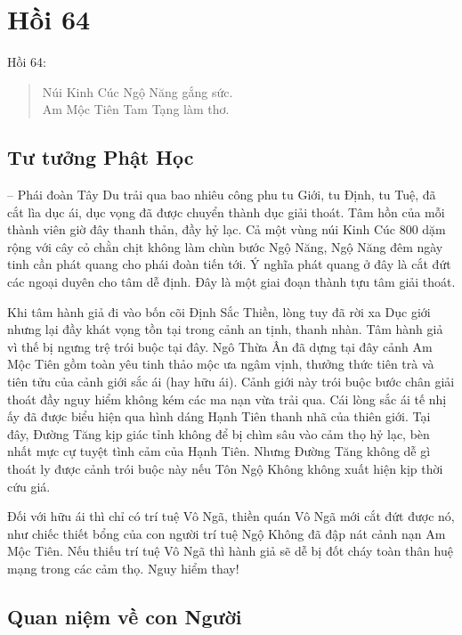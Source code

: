 \chapter{Hồi 64} %
\label{cha:hoi_64}

Hồi 64:

\begin{verse}
\begin{itshape}
Núi Kinh Cúc Ngộ Năng gắng sức.\\
Am Mộc Tiên Tam Tạng làm thơ.
\end{itshape}
\end{verse}

\section{Tư tưởng Phật Học} %
\label{sec:64_phat_hoc}

-- Phái đoàn Tây Du trải qua bao nhiêu công phu tu Giới, tu Định, tu Tuệ, đã cắt lìa dục ái, dục vọng đã được chuyển thành dục giải thoát. Tâm hồn của mỗi thành viên giờ đây thanh thản, đầy hỷ lạc. Cả một vùng núi Kinh Cúc 800 dặm rộng với cây cỏ chằn chịt không làm chùn bước Ngộ Năng, Ngộ Năng đêm ngày tinh cần phát quang cho phái đoàn tiến tới. Ý nghĩa phát quang ở đây là cắt đứt các ngoại duyên cho tâm dễ định. Đây là một giai đoạn thành tựu tâm giải thoát.

Khi tâm hành giả đi vào bốn cõi Định Sắc Thiền, lòng tuy đã rời xa Dục giới nhưng lại đầy khát vọng tồn tại trong cảnh an tịnh, thanh nhàn. Tâm hành giả vì thế bị ngưng trệ trói buộc tại đây. Ngô Thừa Ân đã dựng tại đây cảnh Am Mộc Tiên gồm toàn yêu tinh thảo mộc ưa ngâm vịnh, thưởng thức tiên trà và tiên tửu của cảnh giới sắc ái (hay hữu ái). Cảnh giới này trói buộc bước chân giải thoát đầy nguy hiểm không kém các ma nạn vừa trải qua. Cái lòng sắc ái tế nhị ấy đã được biểu hiện qua hình dáng Hạnh Tiên thanh nhã của thiên giới. Tại đây, Đường Tăng kịp giác tỉnh không để bị chìm sâu vào cảm thọ hỷ lạc, bèn nhất mực cự tuyệt tình cảm của Hạnh Tiên. Nhưng Đường Tăng không dễ gì thoát ly được cảnh trói buộc này nếu Tôn Ngộ Không không xuất hiện kịp thời cứu giá.

Đối với hữu ái thì chỉ có trí tuệ Vô Ngã, thiền quán Vô Ngã mới cắt đứt được nó, như chiếc thiết bổng của con người trí tuệ Ngộ Không đã đập nát cảnh nạn Am Mộc Tiên. Nếu thiếu trí tuệ Vô Ngã thì hành giả sẽ dễ bị đốt cháy toàn thân huệ mạng trong các cảm thọ. Nguy hiểm thay!

\section{Quan niệm về con Người} %
\label{sec:64_con_nguoi}

